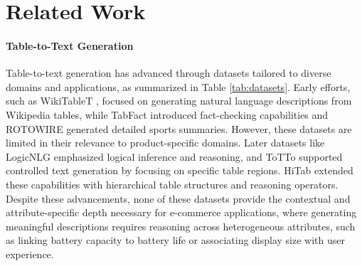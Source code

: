 \section{Related Work}
\paragraph{Table-to-Text Generation} 
Table-to-text generation has advanced through datasets tailored to diverse domains and applications, as summarized in Table \ref{tab:datasets}. Early efforts, such as WikiTableT \cite{chen2021wikitabletlargescaledatatotextdataset}, focused on generating natural language descriptions from Wikipedia tables, while TabFact \cite{2019TabFactA} introduced fact-checking capabilities and ROTOWIRE \cite{wiseman2017challengesdatatodocumentgeneration} generated detailed sports summaries. However, these datasets are limited in their relevance to product-specific domains. Later datasets like LogicNLG \cite{chen2020logicalnaturallanguagegeneration} emphasized logical inference and reasoning, and ToTTo \cite{parikh2020tottocontrolledtabletotextgeneration} supported controlled text generation by focusing on specific table regions. HiTab \cite{cheng-etal-2022-hitab} extended these capabilities with hierarchical table structures and reasoning operators. Despite these advancements, none of these datasets provide the contextual and attribute-specific depth necessary for e-commerce applications, where generating meaningful descriptions requires reasoning across heterogeneous attributes, such as linking battery capacity to battery life or associating display size with user experience. 


